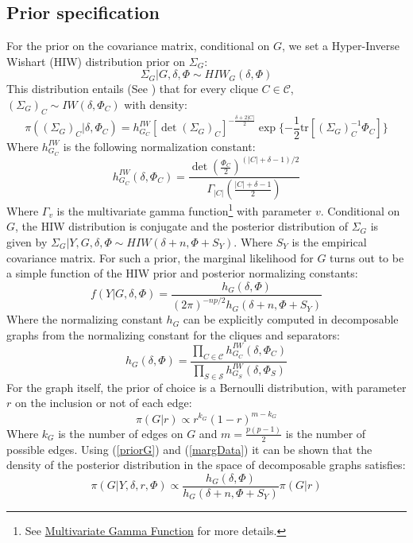 \subsection{Prior specification}
For the prior on the covariance matrix, conditional on $G$, we set a Hyper-Inverse Wishart (HIW) distribution prior on $\Sigma_G$:
\begin{equation*}
    \Sigma_G| G,\delta, \Phi \sim HIW_G (\delta, \Phi)
\end{equation*}
This distribution entails (See \textcite{lauritzen1996graphical}) that for every clique $C \in \mathcal{C}$, $(\Sigma_G)_C \sim IW(\delta, \Phi_C)$ with density:
\begin{equation*}
    \pi((\Sigma_G)_C | \delta, \Phi_C) = h_{G_C}^{IW} [\det (\Sigma_G)_C]^{-\frac{\delta+2|C|}{2}}\exp\{-\frac{1}{2}\text{tr}[(\Sigma_G)_C^{-1} \Phi_C]\}
\end{equation*}
Where $h_{G_C}^{IW}$ is the following normalization constant:
\begin{equation*}
    h_{G_C}^{IW}(\delta, \Phi_C) = \frac{\det(\frac{\Phi_C}{2})^{(|C|+\delta-1)/2}}{\Gamma_{|C|}(\frac{|C| +\delta - 1}{2})}
\end{equation*}
Where $\Gamma_v$ is the multivariate gamma function\footnote{See \href{https://en.wikipedia.org/wiki/Multivariate_gamma_function}{Multivariate Gamma Function} for more details.} with parameter $v$. Conditional on $G$, the HIW distribution is conjugate and the posterior distribution of $\Sigma_G$ is given by $\Sigma_G | Y,G, \delta, \Phi \sim HIW(\delta+n, \Phi + S_Y)$. Where $S_Y$ is the empirical covariance matrix. For such a prior, the marginal likelihood for $G$ turns out to be a simple function of the HIW prior and posterior normalizing constants:
\begin{equation}\label{margData}
    f(Y|G, \delta,\Phi) = \frac{h_G(\delta, \Phi)}{(2\pi)^{-np/2}h_G (\delta+n, \Phi + S_Y)}
\end{equation}
Where the normalizing constant $h_G$ can be explicitly computed in decomposable graphs from the normalizing constant for the cliques and separators:
\begin{equation*}
    h_G(\delta,\Phi) = \frac{\prod_{C\in \mathcal{C}}h_{G _C}^{IW} (\delta, \Phi_C)}{\prod_{S\in \mathcal{S}}h_{G_S}^{IW} (\delta, \Phi_S)}
\end{equation*}
For the graph itself, the prior of choice is a Bernoulli distribution, with parameter $r$ on the inclusion or not of each edge:
\begin{equation}\label{priorG}
    \pi(G|r) \propto r^{k_G} (1-r)^{m-k_G}
\end{equation}
Where $k_G$ is the number of edges on $G$ and $m = \frac{p(p-1)}{2}$ is the number of possible edges.
Using (\ref{priorG}) and (\ref{margData}) it can be shown that the density of the posterior distribution in the space of decomposable graphs satisfies:
\begin{equation}\label{postGraph}
    \pi(G|Y,\delta,r,\Phi) \propto \frac{h_G (\delta,\Phi)}{h_G(\delta+n, \Phi + S_Y)}\pi(G|r)
\end{equation}
